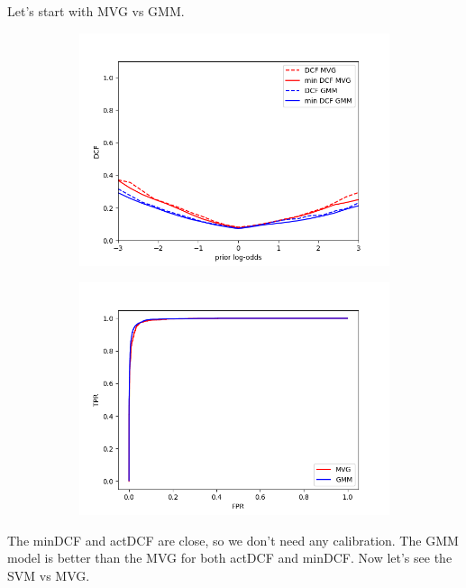 \documentclass[english]{report}
\begin{document}
Let's start with MVG vs GMM.
\begin{figure}[H]
    \begin{subfigure}{0.5\textwidth}
        \includegraphics[scale=0.5]{../../images/comparison/evaluation/DCF_MVG&GMM}
    \end{subfigure}
    \begin{subfigure}{0.5\textwidth}
        \includegraphics[scale=0.5]{../../images/comparison/evaluation/ROC_MVG&GMM}
    \end{subfigure}
    \label{fig:eval_MVGvsGMM}
\end{figure}

The minDCF and actDCF are close, so we don't need any calibration.
The GMM model is better than the MVG for both actDCF and minDCF. Now let's see the SVM vs MVG.
\end{document}
